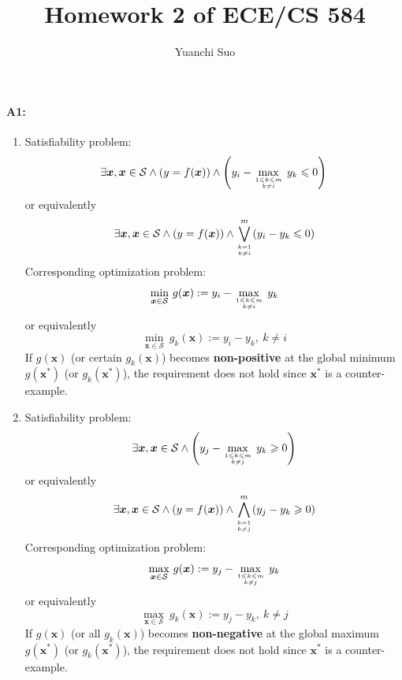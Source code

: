 \documentclass[12pt]{article}
\title{Homework 2 of ECE/CS 584}
\author{Yuanchi Suo}
\newcommand{\inputset}{\mathcal{S}}
\newcommand{\maxwithcond}[2]{\underset{#2}{\max}\ #1}
\newcommand{\minwithcond}[2]{\underset{#2}{\min}\ #1}
\newcommand{\range}[3]{#1 \leqslant #2 \leqslant #3}
\begin{document}
\maketitle

\paragraph{A1:}
\begin{enumerate}[1.]
\item Satisfiability problem:
	\begin{equation}
		\exists \bm{x}, \bm{x} \in \inputset \land (y = f(\bm{x})) \land \left(y_{i} - \maxwithcond{y_{k}}{\range{1}{k}{m} \atop k \neq i} \leqslant 0\right)
	\end{equation}
	or equivalently
	\begin{equation}
		\exists \bm{x}, \bm{x} \in \inputset \land (y = f(\bm{x})) \land \bigvee_{k = 1 \atop k \neq i}^{m} (y_{i} - y_{k} \leqslant 0)
	\end{equation}
	Corresponding optimization problem:
	\begin{equation}
		\minwithcond{g(\bm{x})}{\bm{x} \in \inputset} := y_{i} - \maxwithcond{y_{k}}{\range{1}{k}{m} \atop k \neq i}
	\end{equation}
	or equivalently
	\begin{equation}
		\minwithcond{g_{k}(\bm{x})}{\bm{x} \in \inputset} := y_{i} - y_{k}, \ k \neq i
	\end{equation}
	If $g(\bm{x})$ (or certain $g_{k}(\bm{x})$) becomes \textbf{non-positive} at the global minimum $g(\bm{x}^{\ast})$ (or $g_{k}(\bm{x}^{\ast})$), the requirement does not hold since $\bm{x}^{\ast}$ is a counter-example.

\item Satisfiability problem:
	\begin{equation}
		\exists \bm{x}, \bm{x} \in \inputset \land \left(y_{j} - \maxwithcond{y_{k}}{\range{1}{k}{m} \atop k \neq j} \geqslant 0\right)
	\end{equation}
	or equivalently
	\begin{equation}
		\exists \bm{x}, \bm{x} \in \inputset \land (y = f(\bm{x})) \land \bigwedge_{k = 1 \atop k \neq j}^{m} (y_{j} - y_{k} \geqslant 0)
	\end{equation}
	Corresponding optimization problem:
	\begin{equation}
		\maxwithcond{g(\bm{x})}{\bm{x} \in \inputset} := y_{j} - \maxwithcond{y_{k}}{\range{1}{k}{m} \atop k \neq j}
	\end{equation}
	or equivalently
	\begin{equation}
		\maxwithcond{g_{k}(\bm{x})}{\bm{x} \in \inputset} := y_{j} - y_{k}, \ k \neq j
	\end{equation}
	If $g(\bm{x})$ (or all $g_{k}(\bm{x})$) becomes \textbf{non-negative} at the global maximum $g(\bm{x}^{\ast})$ (or $g_{k}(\bm{x}^{\ast})$), the requirement does not hold since $\bm{x}^{\ast}$ is a counter-example.

\end{enumerate}
\end{document}
